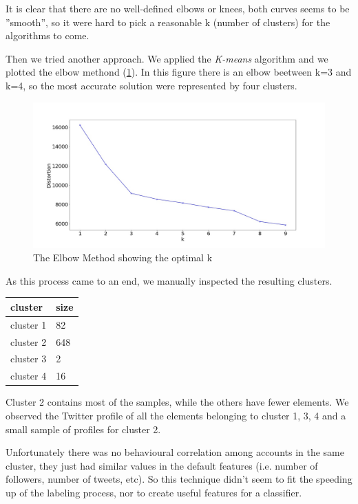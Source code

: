 \newpage
It is clear that there are no well-defined elbows or knees, both curves seems to be ''smooth'', so it were hard to pick a reasonable k (number of clusters) for the algorithms to come.

Then we tried another approach. We applied the \emph{K-means} algorithm and we plotted the elbow methond (\ref{fig:elbow}). In this figure there is an elbow beetween k=3 and k=4, so the most accurate solution were represented by four clusters.

\begin{figure}
	\includegraphics[width=\linewidth]{chapter3/figure/elbow.jpg}
	\caption{The Elbow Method showing the optimal k}
	\label{fig:elbow}
\end{figure}


As this process came to an end, we manually inspected the resulting clusters.

\begin{center}
	\begin{tabular}{ll}
	\\cluster&size\\
	\hline\hline
	cluster 1&82\\
	cluster 2&648\\
	cluster 3&2\\
	cluster 4&16\\\hline
	\end{tabular}
\end{center}

Cluster 2 contains most of the samples, while the others have fewer elements.
We observed the Twitter profile of all the elements belonging to cluster 1, 3, 4 and a small sample of profiles for cluster 2.

Unfortunately there was no behavioural correlation among accounts in the same cluster, they just had similar values in the default features (i.e. number of followers, number of tweets, etc). So this technique didn't seem to fit the speeding up of the labeling process, nor to create useful features for a classifier.

